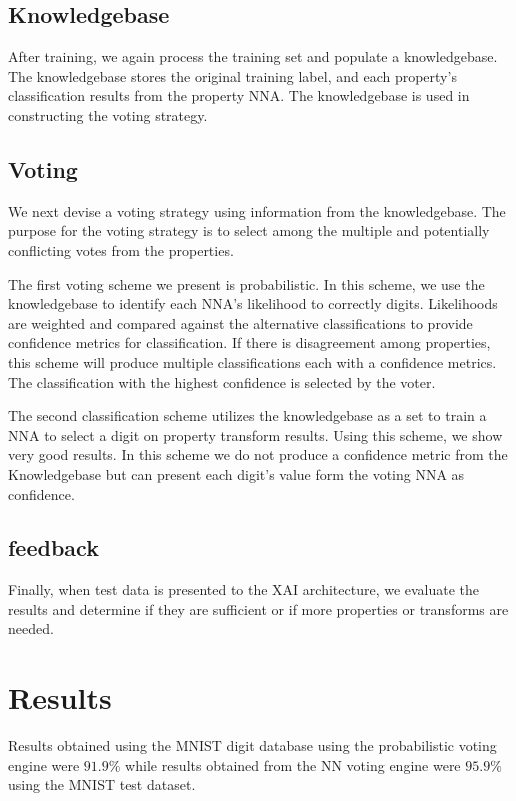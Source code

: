 \documentclass[conference]{IEEEtran}
\begin{document}
\subsection{Knowledgebase}
After training, we again process the training set and populate a knowledgebase.  The knowledgebase stores the original training label, and each property's classification results from the property NNA.  The knowledgebase is used in constructing the voting strategy. 

\subsection{Voting}
We next devise a voting strategy using information from the knowledgebase.  The purpose for the voting strategy is to select among the multiple and potentially conflicting votes from the properties.

The first voting scheme we present is probabilistic.  In this scheme, we use the knowledgebase to identify each NNA's likelihood to correctly digits.  Likelihoods are weighted and compared against the alternative classifications to provide confidence metrics for classification.  If there is disagreement among properties, this scheme will produce multiple classifications each with a confidence metrics.  The classification with the highest confidence is selected by the voter.

The second classification scheme utilizes the knowledgebase as a set to train a NNA to select a digit on property transform results.  Using this scheme, we show very good results.  In this scheme we do not produce a confidence metric from the Knowledgebase but can present each digit's value form the voting NNA as confidence.

\subsection{feedback}
Finally, when test data is presented to the XAI architecture, we evaluate the results and determine if they are sufficient or if more properties or transforms are needed.

\section{Results}

Results obtained using the MNIST digit database using the probabilistic voting engine were $91.9\%$ while results obtained from the NN voting engine were $95.9\%$ using the MNIST test dataset.
\end{document}
